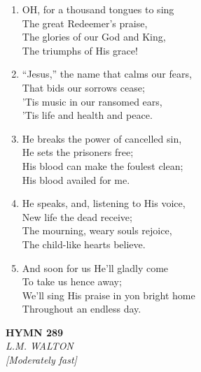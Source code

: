 \begin{enumerate}
    \item OH, for a thousand tongues to sing \\
        The great Redeemer's praise, \\
        The glories of our God and King, \\
        The triumphs of His grace!

    \item ``Jesus,'' the name that calms our fears, \\
        That bids our sorrows cease; \\
        'Tis music in our ransomed ears, \\
        'Tis life and health and peace.

    \item He breaks the power of cancelled sin, \\
        He sets the prisoners free; \\
        His blood can make the foulest clean; \\
        His blood availed for me.

    \item He speaks, and, listening to His voice, \\
        New life the dead receive; \\
        The mourning, weary souls rejoice, \\
        The child-like hearts believe.

    \item And soon for us He'll gladly come \\
        To take us hence away; \\
        We'll sing His praise in yon bright home \\
        Throughout an endless day.

\end{enumerate}

\newpage
\begin{center}
    {\Large \textbf{HYMN 289}}
    \\
    \textit{L.M. WALTON}
    \\
    \textit{\small [Moderately fast]}
\end{center}
\vspace{1em}

